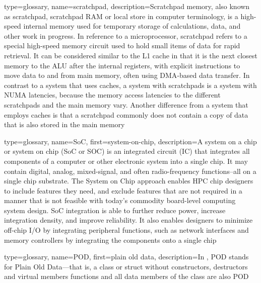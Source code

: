 {
  type={glossary},
  name={scratchpad},
  description={Scratchpad memory, also known as scratchpad, scratchpad
  RAM or local store in computer terminology, is a high-speed internal
  memory used for temporary storage of calculations, data, and other
  work in progress. In reference to a microprocessor, scratchpad
  refers to a special high-speed memory circuit used to hold small
  items of data for rapid retrieval. It can be considered similar to
  the L1 cache in that it is the next closest memory to the \gls{ALU} after
  the internal registers, with explicit instructions to move data to
  and from main memory, often using \gls{DMA}-based data transfer. In
  contrast to a system that uses caches, a system with scratchpads is
  a system with \gls{NUMA} latencies, because the memory access
  latencies to the different scratchpads and the main memory
  vary. Another difference from a system that employs caches is that a
  scratchpad commonly does not contain a copy of data that is also
  stored in the main memory}
}

{
  type={glossary},
  name={SoC},
  first={system-on-chip},
  description={A system on a chip or system on chip (SoC or SOC) is an
  integrated circuit (IC) that integrates all components of a computer
  or other electronic system into a single chip. It may contain
  digital, analog, mixed-signal, and often radio-frequency
  functions--all on a single chip substrate. The System on Chip
  approach enables HPC chip designers to include features they need,
  and exclude features that are not required in a manner that is not
  feasible with today's commodity board-level computing system
  design. SoC integration is able to further reduce power, increase
  integration density, and improve reliability. It also enables
  designers to minimize off-chip I/O by integrating peripheral
  functions, such as network interfaces and memory controllers by
  integrating the components onto a single chip}
}

{
  type={glossary},
  name={POD},
  first={plain old data},
  description={In \CC{}, POD stands for Plain Old Data---that is, a
  class or struct without constructors, destructors and virtual
  members functions and all data members of the class are also POD}
}

